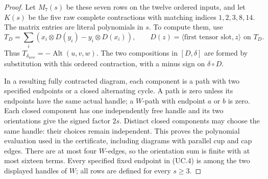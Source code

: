 \begin{proof}
Let $M_7(s)$ be these seven rows on the twelve ordered
inputs, and let $K(s)$ be the five raw complete contractions
with matching indices $1,2,3,8,14$. The matrix entries are
literal polynomials in $s$. To compute them, use
\[
 T_D=\sum_i(x_i\otimes D(y_i)-y_i\otimes D(x_i)),
       \qquad D(z)=\langle\text{first tensor slot},z\rangle
                         \text{ on }T_D.
\]
Thus $T_{\delta_{uvw}}=-\operatorname{Alt}(u,v,w)$.
The two compositions in $[D,\delta]$ are formed by
substitution with this ordered contraction, with a minus
sign on $\delta\circ D$.

In a resulting fully contracted diagram, each component
is a path with two specified endpoints or a closed
alternating cycle. A path is zero unless its endpoints
have the same actual handle; a $W$-path with endpoint
$a$ or $b$ is zero. Each closed component has one
independently free handle and its two orientations give
the signed factor $2s$. Distinct closed components may
choose the same handle: their choices remain independent.
This proves the polynomial evaluation used in the
certificate, including diagrams with parallel cup and
cap edges. There are at most four $W$-edges, so the
orientation sum is finite with at most sixteen terms.
Every specified fixed endpoint in (UC.4) is among the
two displayed handles of $W$; all rows are defined for
every $s\geq3$.


\end{proof}
